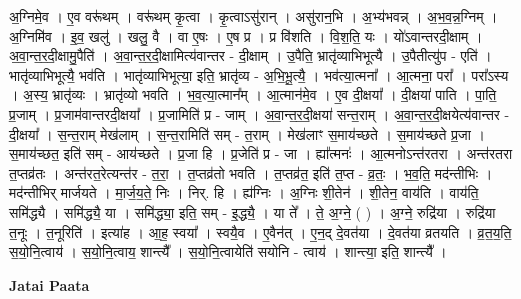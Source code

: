 \documentclass[17pt]{extarticle}
\begin{document}
अ॒ग्निमे॒व । ए॒व वरू॑थम् । वरू॑थम् कृ॒त्वा । कृ॒त्वाऽसु॑रान् । असु॑रान॒भि । अ॒भ्य॑भवन्न् । अ॒भ॒व॒न्न॒ग्निम् । अ॒ग्निमि॑व । इ॒व॒ खलु॑ । खलु॒ वै । वा ए॒षः । ए॒ष प्र । प्र वि॑शति । वि॒श॒ति॒ यः । यो॑ऽवान्तरदी॒क्षाम् । अ॒वा॒न्त॒र॒दी॒क्षामु॒पैति॑ । अ॒वा॒न्त॒र॒दी॒क्षामित्य॑वान्तर - दी॒क्षाम् । उ॒पैति॒ भ्रातृ॑व्याभिभूत्यै । उ॒पैतीत्यु॑प - एति॑ । भातृ॑व्याभिभूत्यै॒ भव॑ति । भातृ॑व्याभिभूत्या॒ इति॒ भ्रातृ॑व्य - अ॒भि॒भू॒त्यै॒ । भव॑त्या॒त्मना᳚ । आ॒त्मना॒ परा᳚ । परा᳚ऽस्य । अ॒स्य॒ भ्रातृ॑व्यः । भ्रातृ॑व्यो भवति । भ॒व॒त्या॒त्मान᳚म् । आ॒त्मान॑मे॒व । ए॒व दी॒क्षया᳚ । दी॒क्षया॑ पाति । पा॒ति॒ प्र॒जाम् । प्र॒जाम॑वान्तरदी॒क्षया᳚ । प्र॒जामिति॑ प्र - जाम् । अ॒वा॒न्त॒र॒दी॒क्षया॑ सन्त॒राम् । अ॒वा॒न्त॒र॒दी॒क्षयेत्य॑वान्तर - दी॒क्षया᳚ । स॒न्त॒राम् मेख॑लाम् । स॒न्त॒रामिति॑ सम् - त॒राम् । मेख॑लाꣳ स॒माय॑च्छते । स॒माय॑च्छते प्र॒जा । स॒माय॑च्छत॒ इति॑ सम् - आय॑च्छते । प्र॒जा हि । प्र॒जेति॑ प्र - जा । ह्या᳚त्मनः॑ । आ॒त्मनोऽन्त॑रतरा । अन्त॑रतरा त॒प्तव्र॑तः । अन्त॑रत॒रेत्यन्त॑र - त॒रा॒ । त॒प्तव्र॑तो भवति । त॒प्तव्र॑त॒ इति॑ त॒प्त - व्र॒तः॒ । भ॒व॒ति॒ मद॑न्तीभिः । मद॑न्तीभिर् मार्जयते । मा॒र्ज॒य॒ते॒ निः । निर्. हि । ह्य॑ग्निः । अ॒ग्निः शी॒तेन॑ । शी॒तेन॒ वाय॑ति । वाय॑ति॒ समि॑द्ध्यै । समि॑द्ध्यै॒ या । समि॑द्ध्या॒ इति॒ सम् - इ॒द्ध्यै॒ । या ते᳚ । ते॒ अ॒ग्ने॒ ( ) । अ॒ग्ने॒ रुद्रि॑या । रुद्रि॑या त॒नूः । त॒नूरिति॑ । इत्या॑ह । आ॒ह॒ स्वया᳚ । स्वयै॒व । ए॒वैन॑त् । ए॒न॒द् दे॒वत॑या । दे॒वत॑या व्रतयति । व्र॒त॒य॒ति॒ स॒यो॒नि॒त्वाय॑ । स॒यो॒नि॒त्वाय॒ शान्त्यै᳚ । स॒यो॒नि॒त्वायेति॑ सयोनि - त्वाय॑ । शान्त्या॒ इति॒ शान्त्यै᳚ । \newline

\textbf{Jatai Paata} \newline
\end{document}
